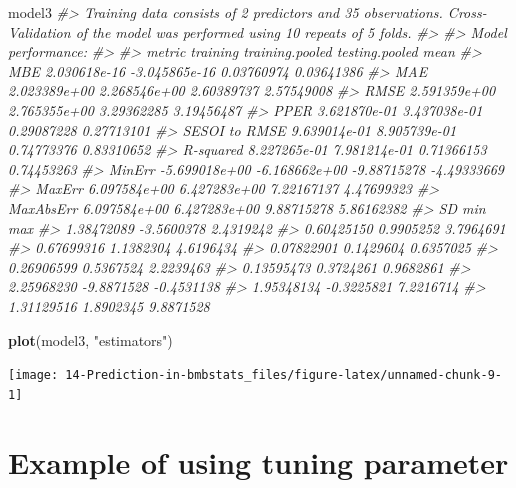 \documentclass[
]{book}
\newenvironment{Shaded}{\begin{snugshade}}{\end{snugshade}}
\newcommand{\CommentTok}[1]{\textcolor[rgb]{0.56,0.35,0.01}{\textit{#1}}}
\newcommand{\KeywordTok}[1]{\textcolor[rgb]{0.13,0.29,0.53}{\textbf{#1}}}
\newcommand{\NormalTok}[1]{#1}
\newcommand{\StringTok}[1]{\textcolor[rgb]{0.31,0.60,0.02}{#1}}
\begin{document}
\begin{Shaded}
\begin{Highlighting}[]
\NormalTok{model3}
\CommentTok{\#> Training data consists of 2 predictors and 35 observations. Cross{-}Validation of the model was performed using 10 repeats of 5 folds.}
\CommentTok{\#> }
\CommentTok{\#> Model performance:}
\CommentTok{\#> }
\CommentTok{\#>         metric      training training.pooled testing.pooled        mean}
\CommentTok{\#>            MBE  2.030618e{-}16   {-}3.045865e{-}16     0.03760974  0.03641386}
\CommentTok{\#>            MAE  2.023389e+00    2.268546e+00     2.60389737  2.57549008}
\CommentTok{\#>           RMSE  2.591359e+00    2.765355e+00     3.29362285  3.19456487}
\CommentTok{\#>           PPER  3.621870e{-}01    3.437038e{-}01     0.29087228  0.27713101}
\CommentTok{\#>  SESOI to RMSE  9.639014e{-}01    8.905739e{-}01     0.74773376  0.83310652}
\CommentTok{\#>      R{-}squared  8.227265e{-}01    7.981214e{-}01     0.71366153  0.74453263}
\CommentTok{\#>         MinErr {-}5.699018e+00   {-}6.168662e+00    {-}9.88715278 {-}4.49333669}
\CommentTok{\#>         MaxErr  6.097584e+00    6.427283e+00     7.22167137  4.47699323}
\CommentTok{\#>      MaxAbsErr  6.097584e+00    6.427283e+00     9.88715278  5.86162382}
\CommentTok{\#>          SD        min        max}
\CommentTok{\#>  1.38472089 {-}3.5600378  2.4319242}
\CommentTok{\#>  0.60425150  0.9905252  3.7964691}
\CommentTok{\#>  0.67699316  1.1382304  4.6196434}
\CommentTok{\#>  0.07822901  0.1429604  0.6357025}
\CommentTok{\#>  0.26906599  0.5367524  2.2239463}
\CommentTok{\#>  0.13595473  0.3724261  0.9682861}
\CommentTok{\#>  2.25968230 {-}9.8871528 {-}0.4531138}
\CommentTok{\#>  1.95348134 {-}0.3225821  7.2216714}
\CommentTok{\#>  1.31129516  1.8902345  9.8871528}
\end{Highlighting}
\end{Shaded}

\begin{Shaded}
\begin{Highlighting}[]
\KeywordTok{plot}\NormalTok{(model3, }\StringTok{"estimators"}\NormalTok{)}
\end{Highlighting}
\end{Shaded}

\begin{center}\texttt{[image: 14-Prediction-in-bmbstats\_files/figure-latex/unnamed-chunk-9-1]} \end{center}

\hypertarget{example-of-using-tuning-parameter}{%
\section{Example of using tuning parameter}\label{example-of-using-tuning-parameter}}
\end{document}

